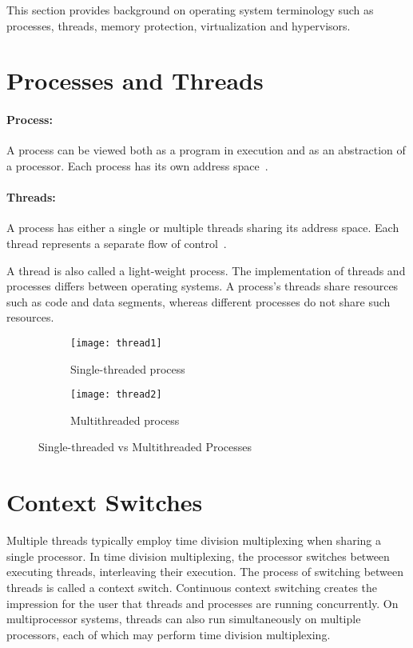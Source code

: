 This section provides background on operating system terminology such
as processes, threads, memory protection, virtualization and hypervisors.

\section{Processes and Threads}
\paragraph{Process:} A process can be viewed both as a program in execution
and as an abstraction of a processor. Each process has its own address
space~\cite{Galvin}.

\paragraph{Threads:} A process has either a single or multiple threads
sharing its address space. Each thread represents a separate flow of
control~\cite{Galvin}.

A thread is also called a light-weight process. The implementation of
threads and processes differs between operating systems. A process's 
threads share resources such as code and data segments, whereas 
different processes do not share such resources.
\begin{figure}[!ht]
    \centering
    \begin{subfigure}[b]{0.45\textwidth}
	\texttt{[image: thread1]}
	\caption{Single-threaded process}
	\label{fig:thread1}
    \end{subfigure}
	\hfill
    \begin{subfigure}[b]{0.45\textwidth}
	\texttt{[image: thread2]}
	\caption{Multithreaded process}
	\label{fig:thread2}
    \end{subfigure}
    \caption{Single-threaded vs Multithreaded Processes}\label{fig:threads}
\end{figure}

\section{Context Switches}
Multiple threads typically employ time division multiplexing when sharing
a single processor.  In time division multiplexing, the processor switches
between executing threads, interleaving their execution. The process of 
switching between threads is called a context switch. Continuous context switching
creates the impression for the user that threads and processes are
running concurrently. On multiprocessor systems, threads can also run
simultaneously on multiple processors, each of which may perform time
division multiplexing.

